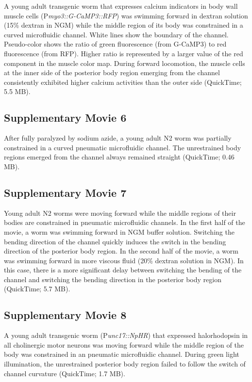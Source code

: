 A young adult transgenic worm that expresses calcium indicators in body wall muscle cells 
(P\textit{myo3::G-CaMP3::RFP}) was swimming forward in dextran solution (15\% dextran in NGM) 
while the middle region of its body was constrained in a curved microfluidic channel. White 
lines show the boundary of the channel. Pseudo-color shows the ratio of green fluorescence 
(from G-CaMP3) to red fluorescence (from RFP). Higher ratio is represented by a larger value of 
the red component in the muscle color map. During forward locomotion, the muscle cells at the 
inner side of the posterior body region emerging from the channel consistently exhibited higher 
calcium activities than the outer side (QuickTime; 5.5 MB). 
 
\subsection{Supplementary Movie 6}\label{movie:prop6}
 
After fully paralyzed by sodium azide, a young adult N2 worm was partially constrained in a 
curved pneumatic microfluidic channel. The unrestrained body regions emerged from the 
channel always remained straight (QuickTime; 0.46 MB).    
 
\subsection{Supplementary Movie 7}\label{movie:prop7}
 
Young adult N2 worms were moving forward while the middle regions of their bodies are 
constrained in pneumatic microfluidic channels. In the first half of the movie, a worm was 
swimming forward in NGM buffer solution. Switching the bending direction of the channel 
quickly induces the switch in the bending direction of the posterior body region. In the second 
half of the movie, a worm was swimming forward in more viscous fluid (20\% dextran solution in 
NGM). In this case, there is a more significant delay between switching the bending of the 
channel and switching the bending direction in the posterior body region (QuickTime; 5.7 MB). 
 
\subsection{Supplementary Movie 8}\label{movie:prop8} 
 
A young adult transgenic worm (P\textit{unc17::NpHR}) that expressed halorhodopsin in all cholinergic 
motor neurons was moving forward while the middle region of the body was constrained in an 
pneumatic microfluidic channel. During green light illumination, the unrestrained posterior body 
region failed to follow the switch of channel curvature (QuickTime; 1.7 MB). 
 

